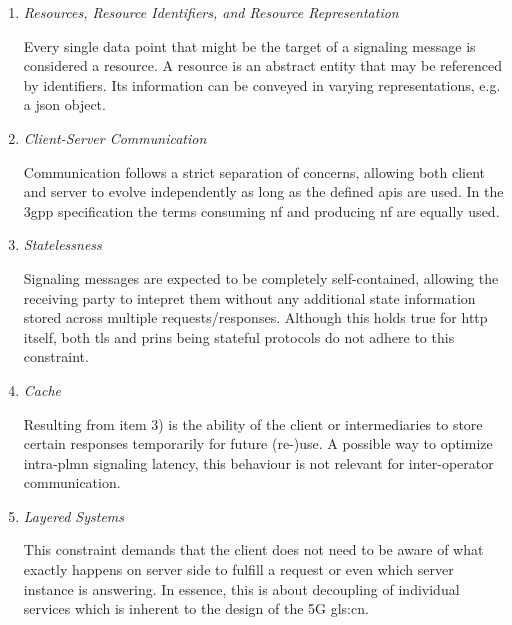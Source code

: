 \begin{enumerate}[label=\arabic*), wide, labelwidth=!, labelindent=0pt]
    \item \textit{Resources, Resource Identifiers, and Resource Representation}
    
    \noindent
    Every single data point that might be the target of a signaling message is considered a resource.
    A resource is an abstract entity that may be referenced by identifiers.
    Its information can be conveyed in varying representations, e.g. a \gls{json} object.

    \item \textit{Client-Server Communication}

    \noindent
    Communication follows a strict separation of concerns, allowing both client and server to evolve independently as long as the defined \glspl{api} are used.
    In the \gls{3gpp} specification the terms consuming \gls{nf} and producing \gls{nf} are equally used.

    \item \textit{Statelessness}

    \noindent
    Signaling messages are expected to be completely self-contained, allowing the receiving party to intepret them without any additional state information stored across multiple requests/responses.
    Although this holds true for \gls{http} itself, both \gls{tls} and \gls{prins} being stateful protocols do not adhere to this constraint.

    \item \textit{Cache}

    \noindent
    Resulting from item 3) is the ability of the client or intermediaries to store certain responses temporarily for future (re-)use.
    A possible way to optimize intra-\gls{plmn} signaling latency, this behaviour is not relevant for inter-operator communication.

    \item \textit{Layered Systems}

    \noindent
    This constraint demands that the client does not need to be aware of what exactly happens on server side to fulfill a request or even which server instance is answering.
    In essence, this is about decoupling of individual services which is inherent to the design of the 5G \gls{gls:cn}.

\end{enumerate}

